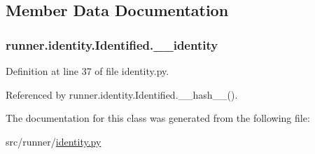 \subsection{Member Data Documentation}
\hypertarget{classrunner_1_1identity_1_1Identified_aad97572b7b42632b1bae5833e3380916}{}
\subsubsection[{\+\_\+\+\_\+identity}]{\setlength{\rightskip}{0pt plus 5cm}runner.\+identity.\+Identified.\+\_\+\+\_\+identity\hspace{0.3cm}{\ttfamily [private]}}\label{classrunner_1_1identity_1_1Identified_aad97572b7b42632b1bae5833e3380916}


Definition at line 37 of file identity.\+py.



Referenced by runner.\+identity.\+Identified.\+\_\+\+\_\+hash\+\_\+\+\_\+().



The documentation for this class was generated from the following file\+:\begin{DoxyCompactItemize}
\item 
src/runner/\hyperlink{identity_8py}{identity.\+py}\end{DoxyCompactItemize}
